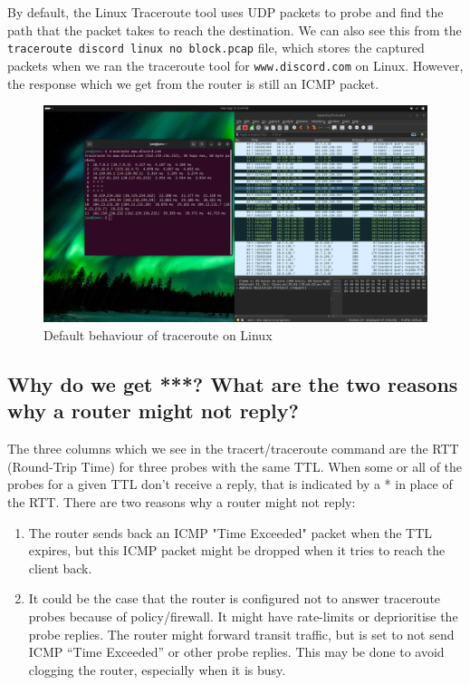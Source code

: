 \documentclass{article}
\begin{document}
By default, the Linux Traceroute tool uses UDP packets to probe and find the path that the packet takes to reach the destination. We can also see this from the \texttt{traceroute discord linux no block.pcap} file, which stores the captured packets when we ran the traceroute tool for \texttt{www.discord.com} on Linux. However, the response which we get from the router is still an ICMP packet.

\begin{figure}[H]
    \centering
    \includegraphics[width=1\linewidth]{traceroute discord no block.png}
    \caption{Default behaviour of traceroute on Linux}
    \label{fig:placeholder}
\end{figure}

\subsection{Why do we get ***? What are the two reasons why a router might not reply?}

The three columns which we see in the tracert/traceroute command are the RTT (Round-Trip Time) for three probes with the same TTL. When some or all of the probes for a given TTL don't receive a reply, that is indicated by a * in place of the RTT. There are two reasons why a router might not reply:

\begin{enumerate}
    \item The router sends back an ICMP "Time Exceeded" packet when the TTL expires, but this ICMP packet might be dropped when it tries to reach the client back.
    \item It could be the case that the router is configured not to answer traceroute probes because of policy/firewall. It might have rate-limits or deprioritise the probe replies. The router might forward transit traffic, but is set to not send ICMP “Time Exceeded” or other probe replies. This may be done to avoid clogging the router, especially when it is busy.
\end{enumerate}
\end{document}
